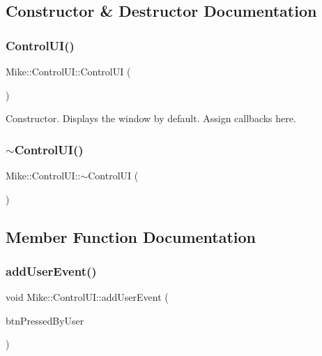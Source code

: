 \subsection{Constructor \& Destructor Documentation}
\mbox{\label{class_mike_1_1_control_u_i_ab62701989c636033cd6756c332a43513}} 
\subsubsection{\texorpdfstring{Control\+U\+I()}{ControlUI()}}
{\footnotesize\ttfamily Mike\+::\+Control\+U\+I\+::\+Control\+UI (\begin{DoxyParamCaption}{ }\end{DoxyParamCaption})}

Constructor. Displays the window by default. Assign callbacks here. \mbox{\label{class_mike_1_1_control_u_i_af2e1bde555402a1035d7f8e2b1525b50}} 
\subsubsection{\texorpdfstring{$\sim$\+Control\+U\+I()}{~ControlUI()}}
{\footnotesize\ttfamily Mike\+::\+Control\+U\+I\+::$\sim$\+Control\+UI (\begin{DoxyParamCaption}{ }\end{DoxyParamCaption})}



\subsection{Member Function Documentation}
\mbox{\label{class_mike_1_1_control_u_i_abcc1603903c8fd267ca9ce1a559266a9}} 
\subsubsection{\texorpdfstring{add\+User\+Event()}{addUserEvent()}}
{\footnotesize\ttfamily void Mike\+::\+Control\+U\+I\+::add\+User\+Event (\begin{DoxyParamCaption}\item[{\hyperlink{namespace_mike_ab036b30a5fb5ef61314086e0c2c5ca6a}{Control\+U\+I\+Button}}]{btn\+Pressed\+By\+User }\end{DoxyParamCaption})\hspace{0.3cm}{\ttfamily [private]}}

